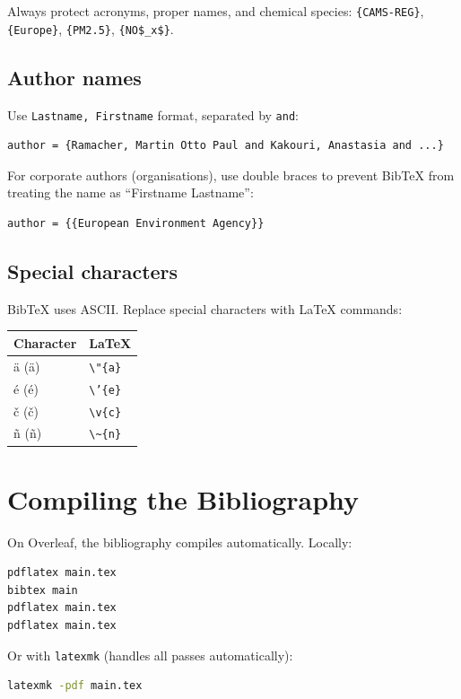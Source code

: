 \documentclass[11pt, a4paper]{article}
\begin{document}
Always protect acronyms, proper names, and chemical species:
\texttt{\{CAMS-REG\}}, \texttt{\{Europe\}}, \texttt{\{PM2.5\}},
\texttt{\{NO\$\_x\$\}}.

\subsection{Author names}
Use \texttt{Lastname, Firstname} format, separated by \texttt{and}:
\begin{lstlisting}
author = {Ramacher, Martin Otto Paul and Kakouri, Anastasia and ...}
\end{lstlisting}
For corporate authors (organisations), use double braces to prevent BibTeX from
treating the name as ``Firstname Lastname'':
\begin{lstlisting}
author = {{European Environment Agency}}
\end{lstlisting}

\subsection{Special characters}
BibTeX uses ASCII. Replace special characters with LaTeX commands:
\begin{tabular}{ll}
  Character & LaTeX \\
  \hline
  \"a (ä) & \texttt{\textbackslash "\{a\}} \\
  \'{e} (é) & \texttt{\textbackslash '\{e\}} \\
  \v{c} (č) & \texttt{\textbackslash v\{c\}} \\
  \~{n} (ñ) & \texttt{\textbackslash \textasciitilde\{n\}} \\
\end{tabular}

\section{Compiling the Bibliography}

On Overleaf, the bibliography compiles automatically. Locally:

\begin{lstlisting}[language=bash]
pdflatex main.tex
bibtex main
pdflatex main.tex
pdflatex main.tex
\end{lstlisting}

Or with \texttt{latexmk} (handles all passes automatically):
\begin{lstlisting}[language=bash]
latexmk -pdf main.tex
\end{lstlisting}
\end{document}
